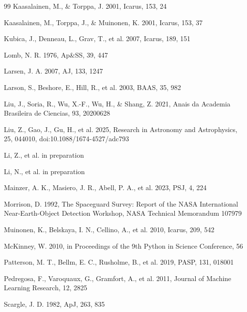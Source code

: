 \documentclass[referee]{raa}
\begin{document}
\begin{thebibliography}{99}
Kaasalainen, M., \& Torppa, J. 2001, Icarus, 153, 24

Kaasalainen, M., Torppa, J., \& Muinonen, K. 2001, Icarus, 153, 37

Kubica, J., Denneau, L., Grav, T., et al. 2007, Icarus, 189, 151

Lomb, N. R. 1976, Ap\&SS, 39, 447

Larsen, J. A. 2007, AJ, 133, 1247

Larson, S., Beshore, E., Hill, R., et al. 2003, BAAS, 35, 982

Liu, J., Soria, R., Wu, X.-F., Wu, H., \& Shang, Z. 2021, Anais da Academia Brasileira de Ciencias, 93, 20200628

Liu, Z., Gao, J., Gu, H., et al. 2025, Research in Astronomy and Astrophysics, 25, 044010, doi:10.1088/1674-4527/adc793

Li, Z., et al. in preparation

Li, N., et al. in preparation

Mainzer, A. K., Masiero, J. R., Abell, P. A., et al. 2023, PSJ, 4, 224

Morrison, D. 1992, The Spaceguard Survey: Report of the NASA International Near-Earth-Object Detection Workshop, NASA Technical Memorandum 107979

Muinonen, K., Belskaya, I. N., Cellino, A., et al. 2010, Icarus, 209, 542

McKinney, W. 2010, in Proceedings of the 9th Python in Science Conference, 56

Patterson, M. T., Bellm, E. C., Rusholme, B., et al. 2019, PASP, 131, 018001

Pedregosa, F., Varoquaux, G., Gramfort, A., et al. 2011, Journal of Machine Learning Research, 12, 2825

Scargle, J. D. 1982, ApJ, 263, 835


\end{thebibliography}
\end{document}
